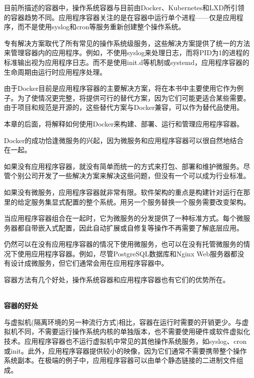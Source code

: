 目前所描述的容器中，操作系统容器与目前由Docker、Kubernetes和LXD所引领的容器趋势不同。应用程序容器关注的是在容器中运行单个进程——仅是应用程序，而不是使用syslog和cron等服务重新创建整个操作系统。

专有解决方案取代了所有常见的操作系统级服务，这些解决方案提供了统一的方法来管理容器内的应用程序。例如，不使用syslog来处理日志，而将PID为1的进程的标准输出视为应用程序日志。而不是使用init.d等机制或systemd，应用程序容器的生命周期由运行时应用程序处理。

由于Docker目前是应用程序容器的主要解决方案，将在本书中主要使用它作为例子。为了使情况更完整，将提供可行的替代方案，因为它们可能更适合某些需要。由于项目和规范是开源的，这些替代方案与Docker兼容，可以作为替代品使用。

本章的后面，将解释如何使用Docker来构建、部署、运行和管理应用程序容器。


Docker的成功恰逢微服务的兴起，因为微服务和应用程序容器可以很自然地结合在一起。

如果没有应用程序容器，就没有简单而统一的方式来打包、部署和维护微服务。尽管个别公司开发了一些解决方案来解决这些问题，但没有一个可以成为行业标准。

如果没有微服务，应用程序容器就非常有限。软件架构的重点是构建针对运行在那里的给定服务集显式配置的整个系统。用另一个服务替换一个服务需要改变架构。

当应用程序容器组合在一起时，它为微服务的分发提供了一种标准方式。每个微服务器都自带嵌入式配置，因此自动扩展或自修复等操作不再需要了解底层应用。

仍然可以在没有应用程序容器的情况下使用微服务，也可以在没有托管微服务的情况下使用应用程序容器。例如，尽管PostgreSQL数据库和Nginx Web服务器都没有设计成微服务，但它们通常会用在应用程序容器中。


容器方法有几个好处，操作系统容器和应用程序容器也有它们的优势所在。

\hspace*{\fill} \\ %
\noindent
\textbf{容器的好处}

与虚拟机(隔离环境的另一种流行方式)相比，容器在运行时需要的开销更少。与虚拟机不同，不需要运行操作系统内核的单独版本，也不需要使用硬件或软件虚拟化技术。应用程序容器也不运行虚拟机中常见的其他操作系统服务，如syslog、cron或init。此外，应用程序容器提供较小的映像，因为它们通常不需要携带整个操作系统副本。在极端的例子中，应用程序容器可以由单个静态链接的二进制文件组成。

